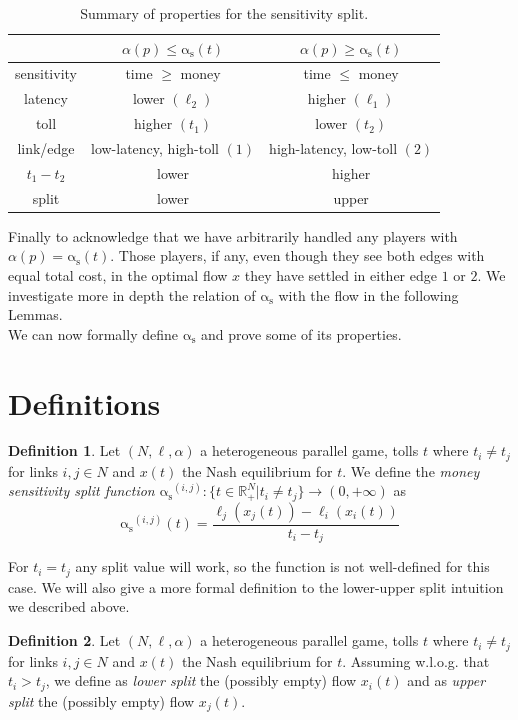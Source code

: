 \documentclass[10pt,a4paper]{book}
\newcommand{\as}{\mathrm{\alpha_s}}
\newcommand{\R}{\mathbb{R}}
\theoremstyle{definition}
\newtheorem{definition}{Definition}[chapter]
\theoremstyle{comment}
\begin{document}
\begin{table}[h!]
	\centering
	\caption{Summary of properties for the sensitivity split.}
	\begin{tabular}{| c || c | c |}
		\hline
		& $\alpha(p) \le \as(t)$ & $\alpha(p) \ge \as(t)$ \\ \hline
		sensitivity & time $\ge$ money & time $\le$ money \\ \hline
		latency & lower $(\ell_2)$ & higher $(\ell_1)$ \\ \hline
		toll & higher $(t_1)$ & lower $(t_2)$ \\ \hline
		link/edge & low-latency, high-toll $(1)$ & high-latency, low-toll $(2)$ \\ \hline
		$t_1 - t_2$ & lower & higher \\ \hline
		split & lower & upper \\ \hline
	\end{tabular}
	\label{table:split_summary}
\end{table}

Finally to acknowledge that we have arbitrarily handled any players with $\alpha(p) = \as(t)$.
Those players, if any, even though they see both edges with equal total cost, in the optimal flow $x$ they have settled in either edge $1$ or $2$.
We investigate more in depth the relation of $\as$ with the flow in the following Lemmas.
\\[12pt]
We can now formally define $\as$ and prove some of its properties.

\section{Definitions}

\begin{definition}
	\label{definition:split_function}
	Let $(N, \ell, \alpha)$ a heterogeneous parallel game, tolls $t$ where $t_i \ne t_j$ for links $i, j \in N$ and $x(t)$ the Nash equilibrium for $t$.
	We define the \textit{money sensitivity split function} $\as^{(i, j)}: \{t \in \R_+^N|t_i \ne t_j\} \rightarrow (0, +\infty)$ as
	\[\as^{(i, j)}(t) = \frac{\ell_j(x_j(t)) - \ell_i(x_i(t))}{t_i - t_j}\]
\end{definition}

For $t_i = t_j$ any split value will work, so the function is not well-defined for this case.
We will also give a more formal definition to the lower-upper split intuition we described above.
\begin{definition}
	\label{definition:split_lower_upper}
	Let $(N, \ell, \alpha)$ a heterogeneous parallel game, tolls $t$ where $t_i \ne t_j$ for links $i, j \in N$ and $x(t)$ the Nash equilibrium for $t$.
	Assuming w.l.o.g. that $t_i > t_j$, we define as \textit{lower split} the (possibly empty) flow $x_i(t)$ and as \textit{upper split} the (possibly empty) flow $x_j(t)$. 
\end{definition}
\end{document}
